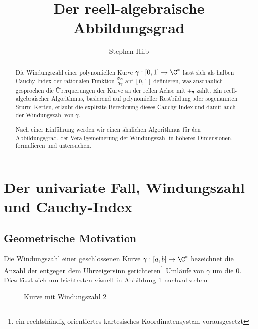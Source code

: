 \documentclass{mythesis}
\title{Der reell-algebraische Abbildungsgrad}
\author{Stephan Hilb}
\begin{document}
\maketitle

\begin{abstract}
    Die Windungszahl einer polynomiellen Kurve $\gamma: [0, 1] \to \C^*$ lässt sich als halben Cauchy-Index der rationalen Funktion $\frac{\Re \gamma}{\Im \gamma}$ auf $[0,1]$ definieren, was anschaulich gesprochen die Überquerungen der Kurve an der rellen Achse mit $\pm \frac{1}{2}$ zählt.
    Ein reell-algebraischer Algorithmus, basierend auf polynomieller Restbildung oder sogenannten Sturm-Ketten, erlaubt die explizite Berechnung dieses Cauchy-Index und damit auch der Windungszahl von $\gamma$.

    Nach einer Einführung werden wir einen ähnlichen Algorithmus für den Abbildungsgrad, der Verallgemeinerung der Windungszahl in höheren Dimensionen, formulieren und untersuchen.
\end{abstract}


{\let\clearpage\relax\tableofcontents}


\section{Der univariate Fall, Windungszahl und Cauchy-Index}

\subsection{Geometrische Motivation}

Die Windungszahl einer geschlossenen Kurve $\gamma: [a,b] \to \C^*$ bezeichnet die Anzahl der entgegen dem Uhrzeigersinn gerichteten\footnote{ein rechtshändig orientiertes kartesisches Koordinatensystem vorausgesetzt} Umläufe von $\gamma$ um die $0$.
Dies lässt sich am leichtesten visuell in Abbildung \ref{fig:winding_number} nachvollziehen.

\begin{figure}[ht]
    \centering
    \caption{Kurve mit Windungszahl 2}
    \label{fig:winding_number}
\end{figure}
\end{document}

